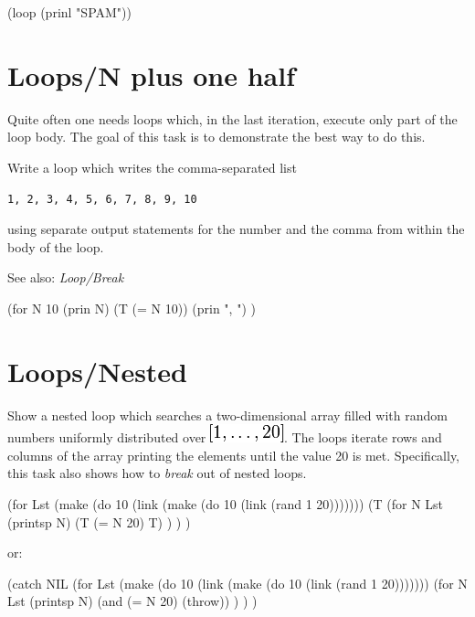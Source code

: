 \begin{itemize}
\begin{wideverbatim}
(loop (prinl "SPAM"))

\end{wideverbatim}

\pagebreak{}
\section*{Loops/N plus one half}

Quite often one needs loops which, in the last iteration, execute only
part of the loop body. The goal of this task is to demonstrate the best
way to do this.

Write a loop which writes the comma-separated list

\begin{verbatim}
1, 2, 3, 4, 5, 6, 7, 8, 9, 10
\end{verbatim}

using separate output statements for the number and the comma from
within the body of the loop.

See also: \emph{Loop/Break}

\begin{wideverbatim}

(for N 10
   (prin N)
   (T (= N 10))
   (prin ", ") )

\end{wideverbatim}

\pagebreak{}
\section*{Loops/Nested}

Show a nested loop which searches a two-dimensional array filled with
random numbers uniformly distributed over
\includegraphics[scale=.6]{graphics/31b36ed3111d6cf3e8fa29c9ef59a501.png}.
The loops iterate rows and columns of the array printing the elements
until the value 20 is met. Specifically, this task also shows how to
\emph{break} out of nested loops.

\begin{wideverbatim}

(for Lst (make (do 10 (link (make (do 10 (link (rand 1 20)))))))
   (T
      (for N Lst
         (printsp N)
         (T (= N 20) T) ) ) )

or:

(catch NIL
   (for Lst (make (do 10 (link (make (do 10 (link (rand 1 20)))))))
      (for N Lst
         (printsp N)
         (and (= N 20) (throw)) ) ) )


\end{wideverbatim}
\end{itemize}
